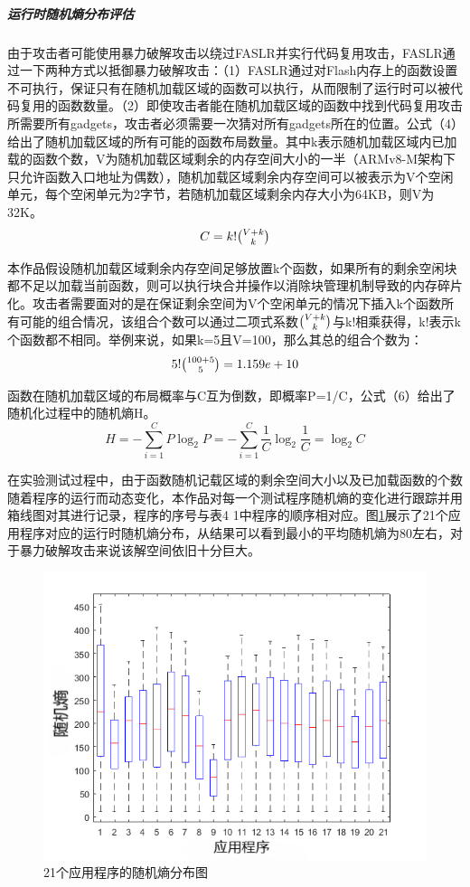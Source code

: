 \documentclass[UTF8,12pt,a4paper]{ctexart}
\numberwithin{figure}{section}
\begin{document}
\subparagraph{运行时随机熵分布评估}
\par 由于攻击者可能使用暴力破解攻击以绕过FASLR并实行代码复用攻击，FASLR通过一下两种方式以抵御暴力破解攻击：（1）FASLR通过对Flash内存上的函数设置不可执行，保证只有在随机加载区域的函数可以执行，从而限制了运行时可以被代码复用的函数数量。（2）即使攻击者能在随机加载区域的函数中找到代码复用攻击所需要所有gadgets，攻击者必须需要一次猜对所有gadgets所在的位置。公式（4）给出了随机加载区域的所有可能的函数布局数量。其中k表示随机加载区域内已加载的函数个数，V为随机加载区域剩余的内存空间大小的一半（ARMv8-M架构下只允许函数入口地址为偶数），随机加载区域剩余内存空间可以被表示为V个空闲单元，每个空闲单元为2字节，若随机加载区域剩余内存大小为64KB，则V为32K。
\begin{equation}
    C = k!\tbinom{V+k}{k}
\end{equation}
\par 本作品假设随机加载区域剩余内存空间足够放置k个函数，如果所有的剩余空闲块都不足以加载当前函数，则可以执行块合并操作以消除块管理机制导致的内存碎片化。攻击者需要面对的是在保证剩余空间为V个空闲单元的情况下插入k个函数所有可能的组合情况，该组合个数可以通过二项式系数$\tbinom{V+k}{k}$与k!相乘获得，k!表示k个函数都不相同。举例来说，如果k=5且V=100，那么其总的组合个数为：
\begin{equation}
    5!\tbinom{100+5}{5}=1.159e+10
\end{equation}
\par 函数在随机加载区域的布局概率与C互为倒数，即概率P=1/C，公式（6）给出了随机化过程中的随机熵H。
\begin{equation}
    H=-\sum_{i=1}^C P\log_2 P = -\sum_{i=1}^{C} \frac{1}{C}\log_2 \frac{1}{C} = \log_2 C
\end{equation}
\par 在实验测试过程中，由于函数随机记载区域的剩余空间大小以及已加载函数的个数随着程序的运行而动态变化，本作品对每一个测试程序随机熵的变化进行跟踪并用箱线图对其进行记录，程序的序号与表4 1中程序的顺序相对应。图\ref{randomEntropy}展示了21个应用程序对应的运行时随机熵分布，从结果可以看到最小的平均随机熵为80左右，对于暴力破解攻击来说该解空间依旧十分巨大。
\begin{figure}[H]
    \label{randomEntropy}
    \centering
    \includegraphics[scale=0.7]{graph/randomEntropy.png}
    \caption{21个应用程序的随机熵分布图}
\end{figure}
\end{document}
